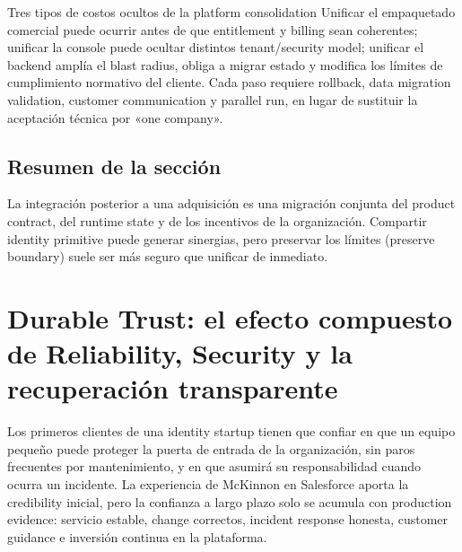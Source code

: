 \documentclass[a4paper]{article}
\begin{document}

\begin{warningbox}{Tres tipos de costos ocultos de la platform consolidation}
Unificar el empaquetado comercial puede ocurrir antes de que entitlement y billing sean coherentes; unificar la console puede ocultar distintos tenant/security model; unificar el backend amplía el blast radius, obliga a migrar estado y modifica los límites de cumplimiento normativo del cliente. Cada paso requiere rollback, data migration validation, customer communication y parallel run, en lugar de sustituir la aceptación técnica por «one company».
\end{warningbox}

\subsection{Resumen de la sección}

La integración posterior a una adquisición es una migración conjunta del product contract, del runtime state y de los incentivos de la organización. Compartir identity primitive puede generar sinergias, pero preservar los límites (preserve boundary) suele ser más seguro que unificar de inmediato.
\section{Durable Trust: el efecto compuesto de Reliability, Security y la recuperación transparente}

Los primeros clientes de una identity startup tienen que confiar en que un equipo pequeño puede proteger la puerta de entrada de la organización, sin paros frecuentes por mantenimiento, y en que asumirá su responsabilidad cuando ocurra un incidente. La experiencia de McKinnon en Salesforce aporta la credibility inicial, pero la confianza a largo plazo solo se acumula con production evidence: servicio estable, change correctos, incident response honesta, customer guidance e inversión continua en la plataforma.
\end{document}
